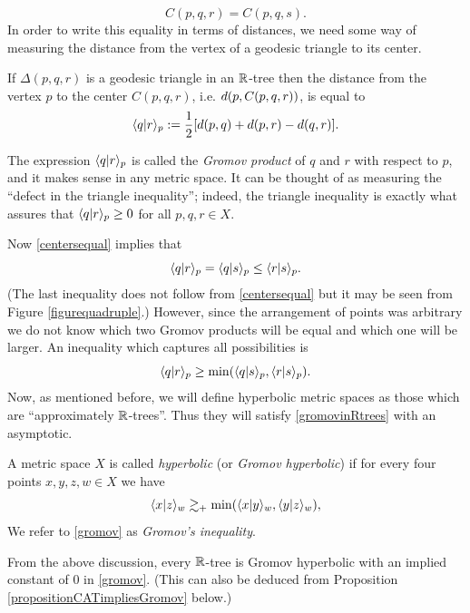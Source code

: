 \begin{equation}
\label{centersequal}
C(p,q,r) = C(p,q,s).
\end{equation}
In order to write this equality in terms of distances, we need some way of measuring the distance from the vertex of a geodesic triangle to its center.
\begin{observation}
If $\Delta(p,q,r)$ is a geodesic triangle in an $\R$-tree then the distance from the vertex $p$ to the center $C(p,q,r)$, i.e. $d(p,C(p,q,r))$, is equal to
\begin{equation}
\label{gromovproduct}
\langle q|r\rangle_p := \frac12[d(p,q) + d(p,r) - d(q,r)].
\end{equation}
\end{observation}
The expression $\langle q|r\rangle_p$ is called the \emph{Gromov product} of $q$ and $r$ with respect to $p$, and it makes sense in any metric space. It can be thought of as measuring the ``defect in the triangle inequality''; indeed, the triangle inequality is exactly what assures that $\langle q|r\rangle_p\geq 0$ for all $p,q,r\in X$.

Now \eqref{centersequal} implies that
\[
\langle q|r\rangle_p = \langle q|s\rangle_p \leq \langle r|s\rangle_p.
\]
(The last inequality does not follow from \eqref{centersequal} but it may be seen from Figure \ref{figurequadruple}.) However, since the arrangement of points was arbitrary we do not know which two Gromov products will be equal and which one will be larger. An inequality which captures all possibilities is
\begin{equation}
\label{gromovinRtrees}
\langle q|r\rangle_p \geq \min(\langle q|s\rangle_p,\langle r|s\rangle_p).
\end{equation}
Now, as mentioned before, we will define hyperbolic metric spaces as those which are ``approximately $\R$-trees''. Thus they will satisfy \eqref{gromovinRtrees} with an asymptotic.
\begin{definition}
\label{definitiongromovhyperbolic}
A metric space $X$ is called \emph{hyperbolic} (or \emph{Gromov hyperbolic}) if for every four points $x,y,z,w\in X$ we have 
\begin{equation}
\label{gromov}
\langle x|z\rangle_w \gtrsim_+ \min(\langle x|y\rangle_w,\langle y|z\rangle_w),
\end{equation}
We refer to \eqref{gromov} as \emph{Gromov's inequality}.
\end{definition}
From the above discussion, every $\R$-tree is Gromov hyperbolic with an implied constant of $0$ in \eqref{gromov}. (This can also be deduced from Proposition \ref{propositionCATimpliesGromov} below.)

